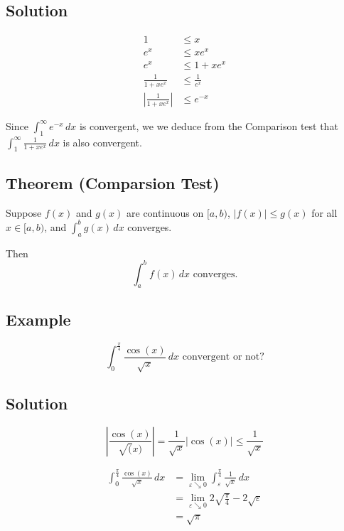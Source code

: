 \documentclass[11pt]{article}
\begin{document}
\subsection*{Solution}
\begin{align*}
1 &\leq x \\
e^x &\leq xe^x \\
e^x &\leq 1 + xe^x \\
\frac{1}{1 + xe^x} &\leq \frac{1}{e^x} \\
\left| \frac{1}{1 + xe^x} \right| &\leq e^{-x}
\end{align*}


Since $\displaystyle \int_1^\infty e^{-x} \,dx$ is convergent, we we deduce from the Comparison test that $\displaystyle \int_1^\infty \frac{1}{1 + xe^x} \,dx$ is also convergent.

\subsection*{Theorem (Comparsion Test)}
Suppose $f(x)$ and $g(x)$ are continuous on $[a, b)$, $|f(x)| \leq g(x) $ for all $ x\in[a,b) $, and $\int_a^b g(x) \,dx$ converges.

Then 
\[ \int_a^b f(x) \,dx \text{ converges.}\]

\subsection*{Example}
\[ \int_0^\frac{\pi}{4} \frac{\cos(x)}{\sqrt{x}} \,dx \text{ convergent or not?} \]

\subsection*{Solution}
\[ 
\left| \frac{\cos(x)}{\sqrt(x)} \right| = \frac{1}{\sqrt{x}} |\cos(x)| \leq \frac{1}{\sqrt{x}}
\]

\begin{align*}
\int_0^\frac{\pi}{4} \frac{\cos(x)}{\sqrt{x}} \,dx &= \lim_{\varepsilon\searrow 0} \int_\varepsilon^\frac{\pi}{4}  \frac{1}{\sqrt{x}} \,dx \\
 &= \lim_{\varepsilon\searrow 0} 2\sqrt{\frac{\pi}{4}} - 2\sqrt{\varepsilon} \\
 &= \sqrt{\pi}
\end{align*}
\end{document}
